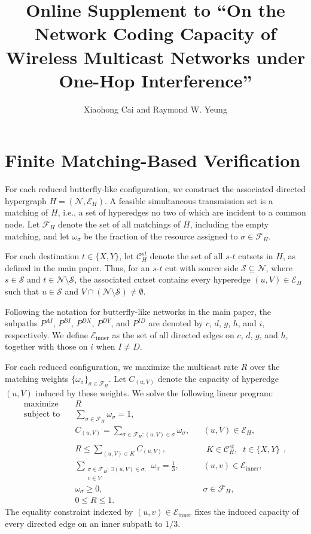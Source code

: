\documentclass[11pt]{article}
\title{Online Supplement to ``On the Network Coding Capacity of Wireless Multicast Networks under One-Hop Interference''}
\author{Xiaohong Cai and Raymond W. Yeung}
\date{}
\begin{document}
\maketitle

\section{Finite Matching-Based Verification}

For each reduced butterfly-like configuration, we construct the associated directed hypergraph \(H=(\mathcal N,\mathcal E_H)\). A feasible simultaneous transmission set is a matching of \(H\), i.e., a set of hyperedges no two of which are incident to a common node. Let \(\mathcal F_H\) denote the set of all matchings of \(H\), including the empty matching, and let \(\omega_\sigma\) be the fraction of the resource assigned to \(\sigma\in\mathcal F_H\).

For each destination \(t\in\{X,Y\}\), let \(\mathcal C_H^{st}\) denote the set of all \(s\)-\(t\) cutsets in \(H\), as defined in the main paper. Thus, for an \(s\)-\(t\) cut with source side \(\mathcal S\subseteq\mathcal N\), where \(s\in\mathcal S\) and \(t\in\mathcal N\setminus\mathcal S\), the associated cutset contains every hyperedge \((u,V)\in\mathcal E_H\) such that \(u\in\mathcal S\) and \(V\cap(\mathcal N\setminus\mathcal S)\neq\emptyset\).

Following the notation for butterfly-like networks in the main paper, the subpaths \(P^{AI}\), \(P^{BI}\), \(P^{DX}\), \(P^{DY}\), and \(P^{ID}\) are denoted by \(c\), \(d\), \(g\), \(h\), and \(i\), respectively. We define \(\mathcal E_{\mathrm{inner}}\) as the set of all directed edges on \(c\), \(d\), \(g\), and \(h\), together with those on \(i\) when \(I\neq D\).

For each reduced configuration, we maximize the multicast rate \(R\) over the matching weights \(\{\omega_\sigma\}_{\sigma\in\mathcal F_H}\). Let \(C_{(u,V)}\) denote the capacity of hyperedge \((u,V)\) induced by these weights. We solve the following linear program:
\[
\begin{aligned}
\text{maximize}\quad
& R\\
\text{subject to}\quad
& \sum_{\sigma\in\mathcal F_H}\omega_\sigma=1,\\
& C_{(u,V)}=\sum_{\sigma\in\mathcal F_H:(u,V)\in\sigma}\omega_\sigma,
&& (u,V)\in\mathcal E_H,\\
& R\le\sum_{(u,V)\in K}C_{(u,V)},
&& \substack{K\in\mathcal C_H^{st}, \;\; t\in\{X,Y\}},\\
& \sum_{\substack{\sigma\in\mathcal F_H:\,\exists (u,V)\in\sigma,\\ v\in V}}\omega_\sigma=\frac13,
&& (u,v)\in\mathcal E_{\mathrm{inner}},\\
& \omega_\sigma\ge0,
&& \sigma\in\mathcal F_H,\\
& 0\le R\le1.
\end{aligned}
\]
The equality constraint indexed by \((u,v)\in\mathcal E_{\mathrm{inner}}\) fixes the induced capacity of every directed edge on an inner subpath to \(1/3\).
\end{document}
